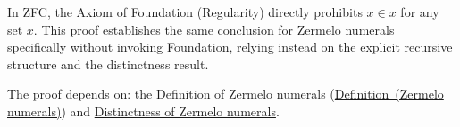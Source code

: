 \begin{remark*}
In ZFC, the Axiom of Foundation (Regularity) directly prohibits $x \in x$ for
any set $x$. This proof establishes the same conclusion for Zermelo numerals
specifically without invoking Foundation, relying instead on the explicit
recursive structure and the distinctness result.
\end{remark*}

\begin{remark*}[Dependencies]
The proof depends on: the Definition of Zermelo numerals
(\hyperref[def:zermelo-numerals]{Definition~(Zermelo numerals)}) and
\hyperref[prop:zermelo-distinct]{Distinctness of Zermelo numerals}.
\end{remark*}
